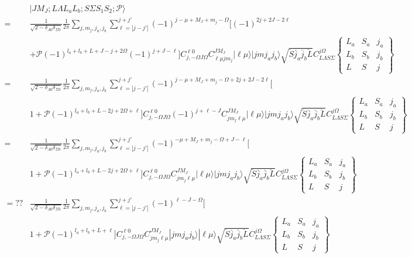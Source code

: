 \documentclass[prl, longbibliography, aps, 10pt]{revtex4-2}
\begin{document}
\begin{equation}
\begin{split}
&|J M_J; L \Lambda L_a L_b; S \Sigma  S_1 S_2; \mathcal{P} \rangle
\\
=&\frac{1}{\sqrt{2-\delta_{\Lambda 0}\delta_{\Sigma 0}}}
\frac{1}{2\pi}
\sum_{j, m_j, j_a, j_b} 
\sum_{\ell=|j-j'|}^{j+j'} 
(-1)^{j-\mu+M_J+m_j-\Omega}
\bigg[
(-1)^{2j+2J-2\ell}
\\
&+\mathcal{P}(-1)^{l_a+l_b+L+J-j+2\Omega}
(-1)^{j+J-\ell}
\bigg]
C_{j,-\Omega J\Omega}^{\ell 0}
C_{\ell \mu j m_j}^{J M_J}
|\ell\mu\rangle |j m j_a j_b\rangle
\sqrt{\breve{S}\breve{j_a}\breve{j_b}\breve{L}} 
C_{L \Lambda S \Sigma}^{j \Omega}
\begin{Bmatrix}
L_a & S_a & j_a\\
L_b & S_b & j_b\\
L & S & j
\end{Bmatrix}
\\
=&\frac{1}{\sqrt{2-\delta_{\Lambda 0}\delta_{\Sigma 0}}}
\frac{1}{2\pi}
\sum_{j, m_j, j_a, j_b} 
\sum_{\ell=|j-j'|}^{j+j'} 
(-1)^{j-\mu+M_J+m_j-\Omega+2j+2J-2\ell}
\bigg[\\
&1+\mathcal{P}(-1)^{l_a+l_b+L-2j+2\Omega+\ell}
\bigg]
C_{j,-\Omega J\Omega}^{\ell 0}
(-1)^{j+\ell-J}
C_{j m_j\ell \mu}^{J M_J}
|\ell\mu\rangle |j m j_a j_b\rangle
\sqrt{\breve{S}\breve{j_a}\breve{j_b}\breve{L}} 
C_{L \Lambda S \Sigma}^{j \Omega}
\begin{Bmatrix}
L_a & S_a & j_a\\
L_b & S_b & j_b\\
L & S & j
\end{Bmatrix}
\\
=&\frac{1}{\sqrt{2-\delta_{\Lambda 0}\delta_{\Sigma 0}}}
\frac{1}{2\pi}
\sum_{j, m_j, j_a, j_b} 
\sum_{\ell=|j-j'|}^{j+j'} 
(-1)^{-\mu+M_J+m_j-\Omega+J-\ell}
\bigg[\\
&1+\mathcal{P}(-1)^{l_a+l_b+L-2j+2\Omega+\ell}
\bigg]
C_{j,-\Omega J\Omega}^{\ell 0}
C_{j m_j\ell \mu}^{J M_J}
|\ell\mu\rangle |j m j_a j_b\rangle
\sqrt{\breve{S}\breve{j_a}\breve{j_b}\breve{L}} 
C_{L \Lambda S \Sigma}^{j \Omega}
\begin{Bmatrix}
L_a & S_a & j_a\\
L_b & S_b & j_b\\
L & S & j
\end{Bmatrix}\\
=??&\frac{1}{\sqrt{2-\delta_{\Lambda 0}\delta_{\Sigma 0}}}
\frac{1}{2\pi}
\sum_{j, m_j, j_a, j_b} 
\sum_{\ell=|j-j'|}^{j+j'} 
(-1)^{\ell-J-\Omega}
\bigg[\\
&1+\mathcal{P}(-1)^{l_a+l_b+L+\ell}
\bigg]
C_{j,-\Omega J\Omega}^{\ell 0}
C_{j m_j\ell \mu}^{J M_J}
 |j m j_a j_b\rangle|\ell\mu\rangle
\sqrt{\breve{S}\breve{j_a}\breve{j_b}\breve{L}} 
C_{L \Lambda S \Sigma}^{j \Omega} 
\begin{Bmatrix}
L_a & S_a & j_a\\
L_b & S_b & j_b\\
L & S & j
\end{Bmatrix}
\end{split}
\end{equation}
\end{document}

